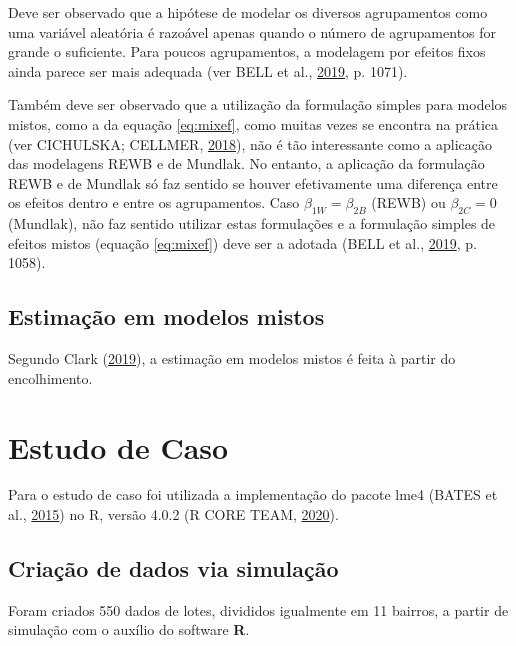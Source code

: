 \documentclass[
  a4paper, 11pt]{article}
\newcommand{\pkg}[1]{{\normalfont\fontseries{b}\selectfont #1}}
\let\proglang=\textsf
\begin{document}
Deve ser observado que a hipótese de modelar os diversos agrupamentos
como uma variável aleatória é razoável apenas quando o número de
agrupamentos for grande o suficiente. Para poucos agrupamentos, a
modelagem por efeitos fixos ainda parece ser mais adequada (ver BELL et
al., \protect\hyperlink{ref-bell2019}{2019}, p. 1071).

Também deve ser observado que a utilização da formulação simples para
modelos mistos, como a da equação \ref{eq:mixef}, como muitas vezes se
encontra na prática (ver CICHULSKA; CELLMER,
\protect\hyperlink{ref-polonia}{2018}), não é tão interessante como a
aplicação das modelagens REWB e de Mundlak. No entanto, a aplicação da
formulação REWB e de Mundlak só faz sentido se houver efetivamente uma
diferença entre os efeitos dentro e entre os agrupamentos. Caso
\(\beta_{1W} = \beta_{2B}\) (REWB) ou \(\beta_{2C} = 0\) (Mundlak), não
faz sentido utilizar estas formulações e a formulação simples de efeitos
mistos (equação \ref{eq:mixef}) deve ser a adotada (BELL et al.,
\protect\hyperlink{ref-bell2019}{2019}, p. 1058).

\hypertarget{estimauxe7uxe3o-em-modelos-mistos}{%
\subsection{Estimação em modelos
mistos}\label{estimauxe7uxe3o-em-modelos-mistos}}

Segundo Clark (\protect\hyperlink{ref-clark2019shrinkage}{2019}), a
estimação em modelos mistos é feita à partir do encolhimento.

\hypertarget{estudo-de-caso}{%
\section{Estudo de Caso}\label{estudo-de-caso}}

Para o estudo de caso foi utilizada a implementação do pacote \pkg{lme4}
(BATES et al., \protect\hyperlink{ref-Bates}{2015}) no \proglang{R},
versão 4.0.2 (R CORE TEAM, \protect\hyperlink{ref-R}{2020}).

\hypertarget{criauxe7uxe3o-de-dados-via-simulauxe7uxe3o}{%
\subsection{Criação de dados via
simulação}\label{criauxe7uxe3o-de-dados-via-simulauxe7uxe3o}}

Foram criados 550 dados de lotes, divididos igualmente em 11 bairros, a
partir de simulação com o auxílio do software \textbf{R}.
\end{document}
